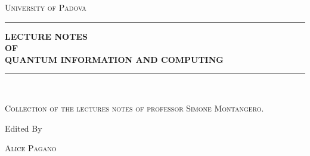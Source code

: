 \begin{titlepage} %

	\newcommand{\HRule}{\rule{\linewidth}{0.5mm}} %
	
	\center %
	
	
	\textsc{\LARGE University of Padova}\vspace{1.5cm} %
	
	
	\HRule \vspace{0.5cm}
	
	\textbf{\LARGE LECTURE NOTES\\ OF\\ QUANTUM INFORMATION AND COMPUTING\\} %
	\vspace{0.5cm}
	\HRule\\[0.5cm]
	
	\vspace{2\baselineskip} %
	
	
	\textsc{ \small Collection of the lectures notes of professor Simone Montangero. }%
	
	\vspace*{3\baselineskip} %
	
	
	Edited By
	
	\vspace{0.5\baselineskip} %
	
	\textsc{ \Large Alice Pagano \\} %
	
	\vspace{0.5\baselineskip} %
	

\end{titlepage}
